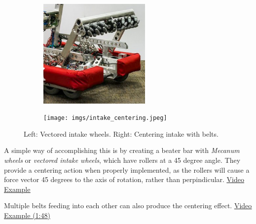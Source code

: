 \begin{figure}[H]
\begin{subfigure}[b]{.45\linewidth}
\includegraphics[height=2.1in]{imgs/intake_vectored.png}
\end{subfigure}\begin{subfigure}[b]{.45\linewidth}
\texttt{[image: imgs/intake\_centering.jpeg]}
\end{subfigure}
\caption{Left: Vectored intake wheels. Right: Centering intake with belts.}
\end{figure}


\begin{asparaitem}[a)]
\item A simple way of accomplishing this is by creating a beater bar with \textit{Mecanum wheels} or \textit{vectored intake wheels}, which have rollers at a 45 degree angle. They provide a centering action when properly implemented, as the rollers will cause a force vector 45 degrees to the axis of rotation, rather than perpindicular. \href{https://www.youtube.com/watch?v=WwxNSiHXREo}{\color{red}\underline{Video Example}}
\item Multiple belts feeding into each other can also produce the centering effect. \href{https://youtu.be/p0_YOm5fjC8?t=107}{\color{red}\underline{Video Example (1:48)}}
\end{asparaitem}

